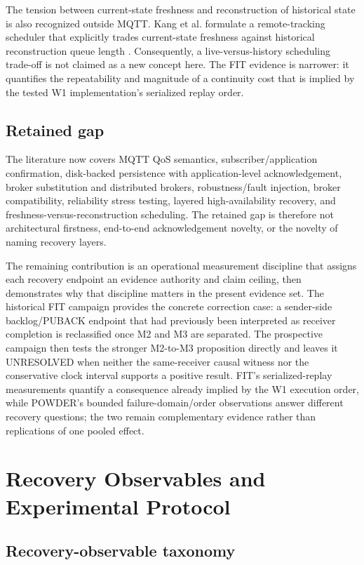 \documentclass[journal]{IEEEtran}
\begin{document}
The tension between current-state freshness and reconstruction of historical state is also recognized outside MQTT. Kang et al. formulate a remote-tracking scheduler that explicitly trades current-state freshness against historical reconstruction queue length \cite{kang2026}. Consequently, a live-versus-history scheduling trade-off is not claimed as a new concept here. The FIT evidence is narrower: it quantifies the repeatability and magnitude of a continuity cost that is implied by the tested W1 implementation's serialized replay order.

\subsection{Retained gap}

The literature now covers MQTT QoS semantics, subscriber/application confirmation, disk-backed persistence with application-level acknowledgement, broker substitution and distributed brokers, robustness/fault injection, broker compatibility, reliability stress testing, layered high-availability recovery, and freshness-versus-reconstruction scheduling. The retained gap is therefore not architectural firstness, end-to-end acknowledgement novelty, or the novelty of naming recovery layers.

The remaining contribution is an operational measurement discipline that assigns each recovery endpoint an evidence authority and claim ceiling, then demonstrates why that discipline matters in the present evidence set. The historical FIT campaign provides the concrete correction case: a sender-side backlog/PUBACK endpoint that had previously been interpreted as receiver completion is reclassified once M2 and M3 are separated. The prospective campaign then tests the stronger M2-to-M3 proposition directly and leaves it UNRESOLVED when neither the same-receiver causal witness nor the conservative clock interval supports a positive result. FIT's serialized-replay measurements quantify a consequence already implied by the W1 execution order, while POWDER's bounded failure-domain/order observations answer different recovery questions; the two remain complementary evidence rather than replications of one pooled effect.

\section{Recovery Observables and Experimental Protocol}
\label{sec:protocol}

\subsection{Recovery-observable taxonomy}
\end{document}
